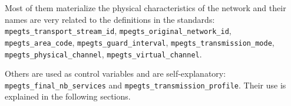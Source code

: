 \documentclass[
	12pt,				%
	openright,			%
	twoside,			%
	a4paper,			%
	brazil,
	french,				%
	english
	]{abntex2}
\begin{document}
Most of them materialize the physical characteristics of the network and their names are very related to the definitions in the standards: \texttt{mpegts\hspace{0.1mm}\_\hspace{0.1mm}transport\hspace{0.1mm}\_\hspace{0.1mm}stream\hspace{0.1mm}\_\hspace{0.1mm}id}, \texttt{mpegts\hspace{0.1mm}\_\hspace{0.1mm}original\hspace{0.1mm}\_\hspace{0.1mm}network\hspace{0.1mm}\_\hspace{0.1mm}id}, \texttt{mpegts\hspace{0.1mm}\_\hspace{0.1mm}area\hspace{0.1mm}\_\hspace{0.1mm}code}, \texttt{mpegts\hspace{0.1mm}\_\hspace{0.1mm}guard\hspace{0.1mm}\_\hspace{0.1mm}interval}, \texttt{mpegts\hspace{0.1mm}\_\hspace{0.1mm}transmission\hspace{0.1mm}\_\hspace{0.1mm}mode}, \texttt{mpegts\hspace{0.1mm}\_\hspace{0.1mm}physical\hspace{0.1mm}\_\hspace{0.1mm}channel}, \texttt{mpegts\hspace{0.1mm}\_\hspace{0.1mm}virtual\hspace{0.1mm}\_\hspace{0.1mm}channel}.

Others are used as control variables and are self-explanatory: \texttt{mpegts\hspace{0.1mm}\_\hspace{0.1mm}final\hspace{0.1mm}\_\hspace{0.1mm}nb\hspace{0.1mm}\_\hspace{0.1mm}services} and \texttt{mpegts\hspace{0.1mm}\_\hspace{0.1mm}transmission\hspace{0.1mm}\_\hspace{0.1mm}profile}. Their use is explained in the following sections.
\end{document}
